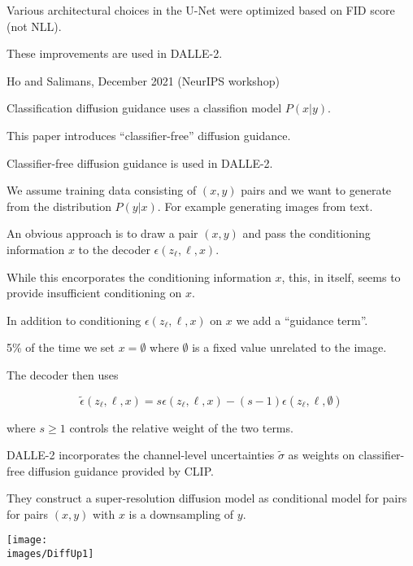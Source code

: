 {Various architectural choices in the U-Net were optimized based on FID score (not NLL).

\vfill
These improvements are used in DALLE-2.


{Ho and Salimans, December 2021 (NeurIPS workshop)}

Classification diffusion guidance uses a classifion model $P(x|y)$.

\vfill
This paper introduces ``classifier-free'' diffusion guidance.

\vfill
Classifier-free diffusion guidance is used in DALLE-2.


We assume training data consisting of $(x,y)$ pairs and we want to generate from the distribution $P(y|x)$.  For example generating images from text.

\vfill
An obvious approach is to draw a pair $(x,y)$ and pass the conditioning information $x$ to the decoder
$\epsilon(z_\ell,\ell,x)$.

\vfill
While this encorporates the conditioning information $x$, this, in itself, seems to provide insufficient conditioning on $x$.

\vfill
In addition to conditioning $\epsilon(z_\ell,\ell,x)$ on $x$ we add a ``guidance term''.


5\% of the time we set $x = \emptyset$ where $\emptyset$ is a fixed value unrelated to the image.

\vfill
The decoder then uses

$$\tilde{\epsilon}(z_\ell,\ell,x) = s\epsilon(z_\ell,\ell,x) - (s-1)\epsilon(z_\ell,\ell,\emptyset)$$

\vfill
where $s \geq 1$ controls the relative weight of the two terms.

\vfill
DALLE-2 incorporates the channel-level uncertainties $\tilde{\sigma}$ as weights on classifier-free diffusion guidance provided by CLIP.


They construct a super-resolution diffusion model as conditional model for pairs for pairs $(x,y)$ with $x$ is a downsampling of $y$.

\vfill
\centerline{\texttt{[image: \\images/DiffUp1]}}


}
